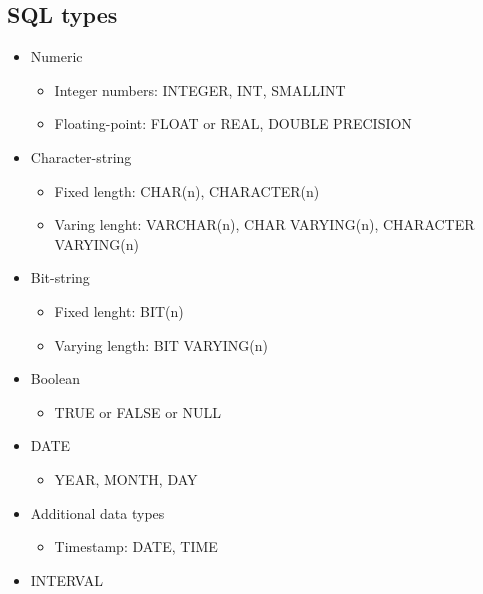 \documentclass{article}
\begin{document}
\subsection{SQL types}
\begin{itemize}
    \item Numeric
    \begin{itemize}
        \item Integer numbers: INTEGER, INT, SMALLINT
        \item Floating-point: FLOAT or REAL, DOUBLE PRECISION
    \end{itemize}
    \item Character-string
    \begin{itemize}
        \item Fixed length: CHAR(n), CHARACTER(n)
        \item Varing lenght: VARCHAR(n), CHAR VARYING(n), CHARACTER VARYING(n)
    \end{itemize}
    \item Bit-string
    \begin{itemize}
        \item Fixed lenght: BIT(n)
        \item Varying length: BIT VARYING(n)
    \end{itemize}
    \item Boolean
    \begin{itemize}
        \item TRUE or FALSE or NULL
    \end{itemize}
    \item DATE
    \begin{itemize}
        \item YEAR, MONTH, DAY
    \end{itemize}
    \item Additional data types 
    \begin{itemize}
        \item Timestamp: DATE, TIME
    \end{itemize}
    \item INTERVAL
\end{itemize}
\end{document}
